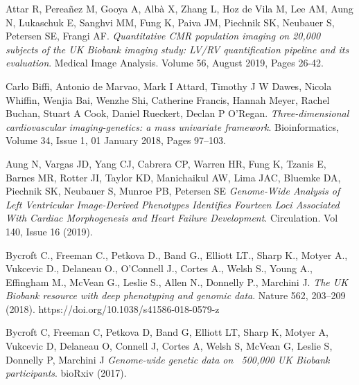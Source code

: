 \documentclass[twocolumn]{llncs}
\begin{document}
\begin{thebibliography}{8}
Attar R, Perea\~nez M, Gooya A, Alb\`a X, Zhang L, Hoz de Vila M, Lee AM, Aung N, Lukaschuk E, Sanghvi MM, Fung K, Paiva JM, Piechnik SK, Neubauer S, Petersen SE, Frangi AF. \textit{Quantitative CMR population imaging on 20,000 subjects of the UK Biobank imaging study: LV/RV quantification pipeline and its evaluation}. Medical Image Analysis. Volume 56, August 2019, Pages 26-42.

Carlo Biffi, Antonio de Marvao, Mark I Attard, Timothy J W Dawes, Nicola Whiffin, Wenjia Bai, Wenzhe Shi, Catherine Francis, Hannah Meyer, Rachel Buchan, Stuart A Cook, Daniel Rueckert, Declan P O’Regan. \textit{Three-dimensional cardiovascular imaging-genetics: a mass univariate framework}. Bioinformatics, Volume 34, Issue 1, 01 January 2018, Pages 97–103.


Aung N, Vargas JD, Yang CJ, Cabrera CP, Warren HR, Fung K, Tzanis E, Barnes MR, Rotter JI, Taylor KD, Manichaikul AW, Lima JAC, Bluemke DA, Piechnik SK, Neubauer S, Munroe PB, Petersen SE
\textit{Genome-Wide Analysis of Left Ventricular Image-Derived Phenotypes Identifies Fourteen Loci Associated With Cardiac Morphogenesis and Heart Failure Development}. Circulation. Vol 140, Issue 16 (2019).


Bycroft C., Freeman C., Petkova D., Band G., Elliott LT., Sharp K., Motyer A., Vukcevic D., Delaneau O., O’Connell J., Cortes A., Welsh S., Young A., Effingham M., McVean G., Leslie S., Allen N., Donnelly P., Marchini J. \textit{The UK Biobank resource with deep phenotyping and genomic data}. Nature 562, 203–209 (2018). https://doi.org/10.1038/s41586-018-0579-z


Bycroft C, Freeman C, Petkova D, Band G, Elliott LT, Sharp K, Motyer A, Vukcevic D, Delaneau O, Connell J, Cortes A, Welsh S, McVean G, Leslie S, Donnelly P, Marchini J
\textit{Genome-wide genetic data on ~500,000 UK Biobank participants}. bioRxiv (2017).


\end{thebibliography}
\end{document}
